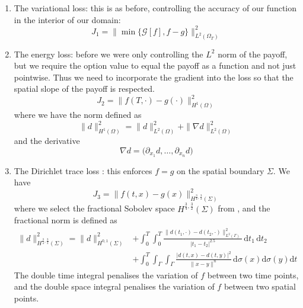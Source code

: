 \begin{enumerate}
    \item The variational loss: this is as before, controlling the accuracy of our function in the interior of our domain:
    \begin{equation}
        J_1 = \|\min \{\mathcal G[f], f-g\}\|^2_{L^2(\Omega_T)}
    \end{equation}

    \item The energy loss: before we were only controlling the $L^2$ norm of the payoff, but we require the option value to equal the payoff as a function and not just pointwise. Thus we need to incorporate the gradient into the loss so that the spatial slope of the payoff is respected.
    \begin{equation}
        J_2 = \|f(T, \cdot) - g(\cdot) \|^2_{H^1(\Omega)}
    \end{equation}
    where we have the norm defined as
    \begin{equation}
        \|d\|^2_{H^1(\Omega)} = \|d\|^2_{L^2(\Omega)} + \|\nabla d\|^2_{L^2(\Omega)}
    \end{equation}
    and the derivative
    \begin{equation}\nabla d = \big(\partial_{x_1}d, \dots, \partial_{x_n}d\big)\end{equation}

    \item The Dirichlet trace loss \cite{zang2020weak}: this enforces $f = g$ on the spatial boundary $\Sigma$. We have
    \begin{equation}
        J_3 =\|f(t, x) - g( x)\|^2_{H^{\frac 34, \frac 32}(\Sigma)}
    \end{equation}
    where we select the fractional Sobolev space $H^{\frac 34, \frac 32}(\Sigma)$ from \cite{zhao2025neural}, and the fractional norm is defined as
    \begin{equation}
        \begin{aligned}
            \|d\|^2_{H^{\frac 34, \frac 32}(\Sigma)} = \|d\|^2_{H^{0,1}(\Sigma)} &+ \int_0^T\int_0^T\frac{\|d(t_1, \cdot) - d(t_2, \cdot)\|^2_{L^2(\Gamma)}}{|t_1-t_2|^{2.5}}\,\mathrm dt_1\,\mathrm dt_2 \\ &+ \int_0^T\int_\Gamma\int_\Gamma \frac{|d(t, x) - d(t, y)|^2}{\|x-y\|^{n}}\,\mathrm d\sigma(x)\mathrm d\sigma(y) \mathrm dt
        \end{aligned}
    \end{equation}
    The double time integral penalises the variation of $f$ between two time points, and the double space integral penalises the variation of $f$ between two spatial points.


\end{enumerate}
